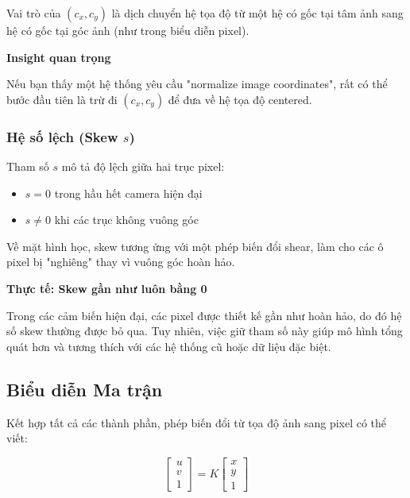 Vai trò của $(c_x, c_y)$ là dịch chuyển hệ tọa độ từ một hệ có gốc tại tâm ảnh sang hệ có gốc tại góc ảnh (như trong biểu diễn pixel).

\begin{mdframed}[style=infobox]
	\textbf{Insight quan trọng}
	
	Nếu bạn thấy một hệ thống yêu cầu "normalize image coordinates", rất có thể bước đầu tiên là trừ đi $(c_x, c_y)$ để đưa về hệ tọa độ centered.
\end{mdframed}

\subsubsection{Hệ số lệch (Skew $s$)}

Tham số $s$ mô tả độ lệch giữa hai trục pixel:

\begin{itemize}
	\item $s = 0$ trong hầu hết camera hiện đại
	\item $s \neq 0$ khi các trục không vuông góc
\end{itemize}

Về mặt hình học, skew tương ứng với một phép biến đổi shear, làm cho các ô pixel bị "nghiêng" thay vì vuông góc hoàn hảo.

\begin{mdframed}[style=infobox]
	\textbf{Thực tế: Skew gần như luôn bằng 0}
	
	Trong các cảm biến hiện đại, các pixel được thiết kế gần như hoàn hảo, do đó hệ số skew thường được bỏ qua. Tuy nhiên, việc giữ tham số này giúp mô hình tổng quát hơn và tương thích với các hệ thống cũ hoặc dữ liệu đặc biệt.
\end{mdframed}

\subsection{Biểu diễn Ma trận}
\label{subsec:intrinsic_matrix_form}

Kết hợp tất cả các thành phần, phép biến đổi từ tọa độ ảnh sang pixel có thể viết:

\[
\begin{bmatrix}
	u \\
	v \\
	1
\end{bmatrix}
=
K
\begin{bmatrix}
	x \\
	y \\
	1
\end{bmatrix}
\]

